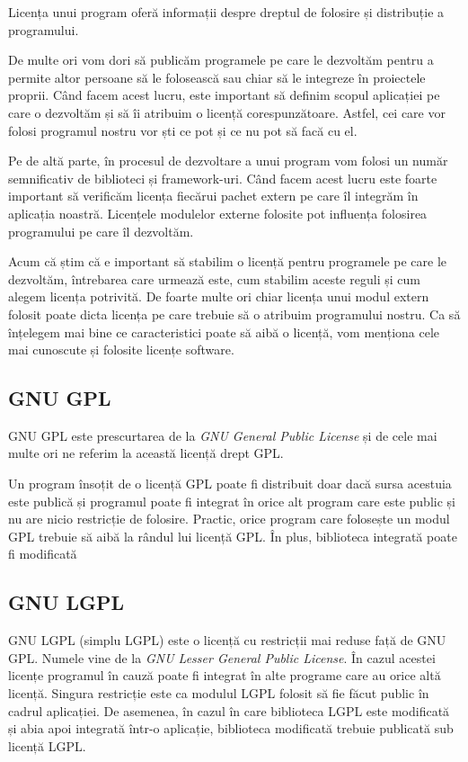 Licența unui program oferă informații despre dreptul de folosire și distribuție
a programului.

De multe ori vom dori să publicăm programele pe care le dezvoltăm pentru a
permite altor persoane să le folosească sau chiar să le integreze în proiectele
proprii. Când facem acest lucru, este important să definim scopul aplicației pe
care o dezvoltăm și să îi atribuim o licență corespunzătoare. Astfel, cei care
vor folosi programul nostru vor ști ce pot și ce nu pot să facă cu el.

Pe de altă parte, în procesul de dezvoltare a unui program vom folosi un număr
semnificativ de biblioteci și framework-uri. Când facem acest lucru este foarte
important să verificăm licența fiecărui pachet extern pe care îl integrăm în
aplicația noastră. Licențele modulelor externe folosite pot influența folosirea
programului pe care îl dezvoltăm.

Acum că știm că e important să stabilim o licență pentru programele pe care le
dezvoltăm, întrebarea care urmează este, cum stabilim aceste reguli și cum
alegem licența potrivită. De foarte multe ori chiar licența unui modul extern
folosit poate dicta licența pe care trebuie să o atribuim programului nostru. Ca
să înțelegem mai bine ce caracteristici poate să aibă o licență, vom menționa
cele mai cunoscute și folosite licențe software.

\subsection{GNU GPL}
\label{sec:appdev-licensing-gpl}

GNU  GPL  este prescurtarea de la \textit{GNU General Public License} și de cele mai multe
ori ne referim la această licență drept GPL.

Un program însoțit de o licență GPL poate fi distribuit doar dacă sursa acestuia
este publică și programul poate fi integrat în orice alt program care este
public și nu are nicio restricție de folosire. Practic, orice program care
folosește un modul GPL trebuie să aibă la rândul lui licență GPL. În plus,
biblioteca integrată poate fi modificată

\subsection{GNU LGPL}
\label{sec:appdev-licensing-lgpl}

GNU LGPL  (simplu LGPL) este
o licență cu restricții mai reduse față de GNU GPL. Numele vine de la \textit{GNU
Lesser General Public License}. În cazul acestei licențe programul în cauză poate
fi integrat în alte programe care au orice altă licență. Singura restricție este
ca modulul LGPL folosit să fie făcut public în cadrul aplicației. De asemenea,
în cazul în care biblioteca LGPL este modificată și abia apoi integrată într-o
aplicație, biblioteca modificată trebuie publicată sub licență LGPL.

